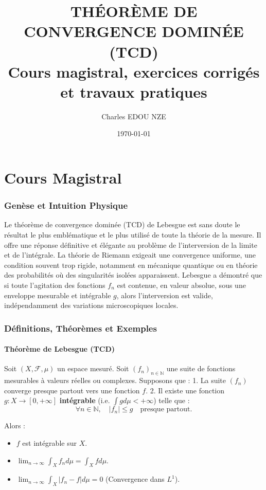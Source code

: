 \documentclass[11pt,a4paper]{article}
\title{\Huge THÉORÈME DE CONVERGENCE DOMINÉE (TCD) \\ \large Cours magistral, exercices corrigés et travaux pratiques}
\author{\Large Charles EDOU NZE}
\date{\today}
\begin{document}
\maketitle
\tableofcontents
\newpage

\part{Cours Magistral}



\section{Genèse et Intuition Physique}

Le théorème de convergence dominée (TCD) de Lebesgue est sans doute le résultat le plus emblématique et le plus utilisé de toute la théorie de la mesure. Il offre une réponse définitive et élégante au problème de l'interversion de la limite et de l'intégrale.
La théorie de Riemann exigeait une convergence uniforme, une condition souvent trop rigide, notamment en mécanique quantique ou en théorie des probabilités où des singularités isolées apparaissent. Lebesgue a démontré que si toute l'agitation des fonctions $f_n$ est contenue, en valeur absolue, sous une enveloppe mesurable et intégrable $g$, alors l'interversion est valide, indépendamment des variations microscopiques locales.

\section{Définitions, Théorèmes et Exemples}

\subsection{Théorème de Lebesgue (TCD)}

Soit $(X, \mathcal{F}, \mu)$ un espace mesuré.
Soit $(f_n)_{n \in \mathbb{N}}$ une suite de fonctions mesurables à valeurs réelles ou complexes.
Supposons que :
1. La suite $(f_n)$ converge presque partout vers une fonction $f$.
2. Il existe une fonction $g : X \to [0, +\infty]$ \textbf{intégrable} (i.e. $\int g d\mu < +\infty$) telle que :
   $$\forall n \in \mathbb{N}, \quad |f_n| \le g \quad \text{presque partout.}$$

Alors :
\begin{itemize}
\item $f$ est intégrable sur $X$.
\item $\lim_{n \to \infty} \int_X f_n d\mu = \int_X f d\mu$.
\item $\lim_{n \to \infty} \int_X |f_n - f| d\mu = 0$ (Convergence dans $L^1$).

\end{itemize}
\end{document}
